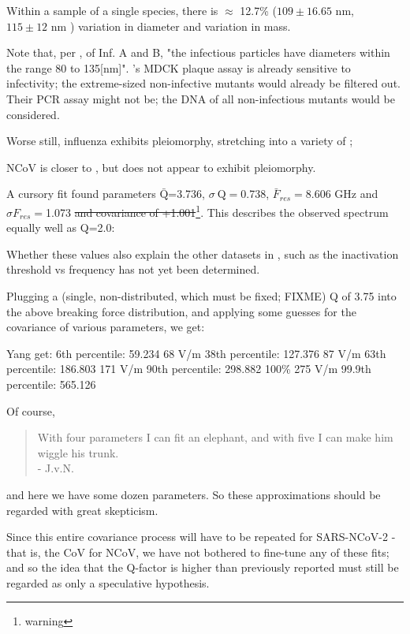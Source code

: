 \documentclass[paper.tex]{subfiles}
\begin{document}
Within a sample of a single species, there is $\approx$ 12.7\%  ($109 \pm 16.65 \text{ nm}$\cite{lauffer1944biophysical}, $115 \pm 12 \text{ nm}$ \cite{Characterization1984}) variation in diameter and  \cite{Characterization1984} variation in mass.



Note that, per \cite{lauffer1944biophysical}, of Inf. A and B, "the infectious particles have diameters within the range 80 to 135[nm]". \cite{Efficient2015}'s MDCK plaque assay is already sensitive to infectivity; the extreme-sized non-infective mutants would already be filtered out. Their PCR assay might not be; the DNA of all non-infectious mutants would be considered.


Worse still, influenza exhibits pleiomorphy, stretching into a variety of \cite{Influenza2006}; 

NCoV is closer to \cite{Viral2020}, but does not appear to exhibit pleiomorphy.

A cursory fit found parameters $\bar{\text{Q}}$=3.736,  $\sigma \ \text{Q} = $0.738, $\bar{F}_{res}=$8.606 GHz and $\sigma {F_{res}}=$1.073 \st{and covariance of +1.001}\footnote{warning}. This describes the observed spectrum equally well as Q=2.0:

Whether these values also explain the other datasets in \cite{Efficient2015}, such as the inactivation threshold vs frequency has not yet been determined.

Plugging a (single, non-distributed, which must be fixed; FIXME) Q of 3.75 into the above breaking force distribution, and applying some guesses for the covariance of various parameters, we get:

								Yang get:
6th percentile: 59.234       68 V/m
38th percentile: 127.376		87 V/m
63th percentile: 186.803		171 V/m
90th percentile: 298.882     100\% 275 V/m
99.9th percentile: 565.126 

Of course, 
\begin{quote}
	With four parameters I can fit an elephant, and with five I can make him wiggle his trunk. \\- J.v.N.
\end{quote}

and here we have some dozen parameters. So these approximations should be regarded with great skepticism.

Since this entire covariance process will have to be repeated for SARS-NCoV-2 - that is, the CoV for NCoV, we have not bothered to fine-tune any of these fits; and so the idea that the Q-factor is higher than previously reported must still be regarded as only a speculative hypothesis.
\end{document}
